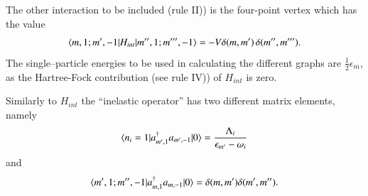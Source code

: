 The other interaction to be included (rule II)) is the four-point vertex which has the value 
 \begin{align}\label{eqC1A53} 
\langle {m,1;m',-1|H_{int}|m'',1;m''',-1} \rangle=-V\delta(m,m')\,\delta(m'',m''').
 \end{align} 
The single--particle energies to be used in calculating the different graphs are $\frac{1}{2}\epsilon_m$, as the Hartree-Fock contribution (see rule IV)) of $H_{int}$ is zero. 


Similarly to $H_{int}$ the ``inelastic operator'' has two different matrix elements, namely 
 \begin{align}\label{eqC1A54} 
 \langle {n_i=1|a^\dagger_{m',1}a_{m',-1}|0} \rangle=\frac{\Lambda_i}{\epsilon_{m'}-\omega_i}
 \end{align} 
 and
  \begin{align}\label{eqC1A55} 
 \langle {m',1;m'',-1|a^\dagger_{m,1}a_{m,-1}|0} \rangle=\delta(m,m')\delta(m',m'').
  \end{align} 
